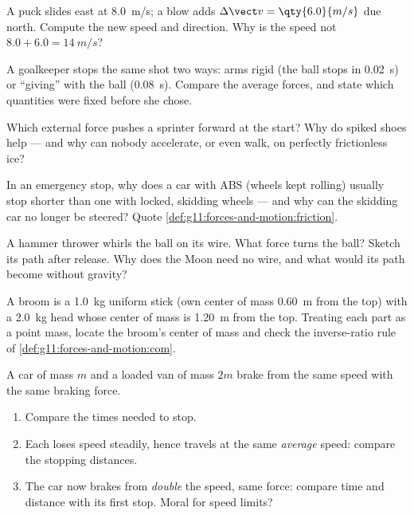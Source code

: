 \begin{exercise}[$\star\star$]\label{exo:g11:forces-and-motion:7}
A puck slides east at \qty{8.0}{m/s}; a blow adds
$\Delta \vect v = \qty{6.0}{m/s}$ due north. Compute the new speed and
direction. Why is the speed not $8.0 + 6.0 = \qty{14}{m/s}$?
\end{exercise}

\begin{exercise}[$\star\star$]\label{exo:g11:forces-and-motion:8}
A goalkeeper stops the same shot two ways: arms rigid (the ball stops in
\qty{0.02}{s}) or ``giving'' with the ball (\qty{0.08}{s}). Compare the
average forces, and state which quantities were fixed before she chose.
\end{exercise}

\begin{exercise}[$\star\star$]\label{exo:g11:forces-and-motion:9}
Which external force pushes a sprinter forward at the start? Why do
spiked shoes help --- and why can nobody accelerate, or even walk, on
perfectly frictionless ice?
\end{exercise}

\begin{exercise}[$\star\star$]\label{exo:g11:forces-and-motion:10}
In an emergency stop, why does a car with ABS (wheels kept rolling)
usually stop shorter than one with locked, skidding wheels --- and why
can the skidding car no longer be steered? Quote
\cref{def:g11:forces-and-motion:friction}.
\end{exercise}

\begin{exercise}[$\star\star$]\label{exo:g11:forces-and-motion:11}
A hammer thrower whirls the ball on its wire. What force turns the
ball? Sketch its path after release. Why does the Moon need no wire,
and what would its path become without gravity?
\end{exercise}

\begin{exercise}[$\star\star\star$]\label{exo:g11:forces-and-motion:12}
A broom is a \qty{1.0}{kg} uniform stick (own center of mass
\qty{0.60}{m} from the top) with a \qty{2.0}{kg} head whose center of
mass is \qty{1.20}{m} from the top. Treating each part as a point mass,
locate the broom's center of mass and check the inverse-ratio rule of
\cref{def:g11:forces-and-motion:com}.
\end{exercise}

\begin{exercise}[$\star\star\star$]\label{exo:g11:forces-and-motion:13}
A car of mass $m$ and a loaded van of mass $2m$ brake from the same
speed with the same braking force.
\begin{enumerate}
  \item Compare the times needed to stop.
  \item Each loses speed steadily, hence travels at the same
        \emph{average} speed: compare the stopping distances.
  \item The car now brakes from \emph{double} the speed, same force:
        compare time and distance with its first stop. Moral for speed limits?
\end{enumerate}
\end{exercise}

